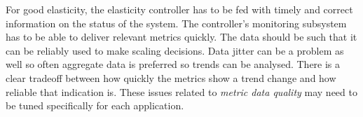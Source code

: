 \documentclass[english]{tktltiki2}
\theoremstyle{definition}
\theoremstyle{remark}
\begin{document}
	\begin{table}[h]
	    \caption{QoE factors and the system components which can affect them.}
	    \label{table:QoEFactors}

	\end{table}

For good elasticity, the elasticity controller has to be fed with timely and
correct information on the status of the system. The controller's monitoring
subsystem has to be able to deliver relevant metrics quickly. The data should be
such that it can be reliably used to make scaling decisions. Data jitter can be
a problem as well so often aggregate data is preferred so trends can be
analysed. There is a clear tradeoff between how quickly the metrics show a trend
change and how reliable that indication is. These issues related to
\textit{metric data quality} may need to be tuned specifically for each
application.
\end{document}
